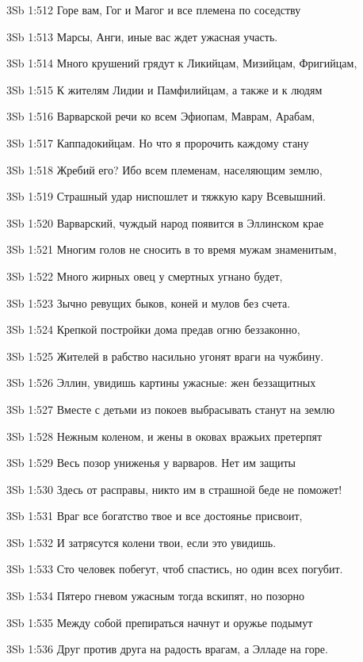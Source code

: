 \vs 3Sb 1:512 Горе вам, Гог и Магог и все племена по соседству  

\vs 3Sb 1:513 Марсы, Анги, иные  вас ждет ужасная участь.

\vs 3Sb 1:514 Много крушений грядут к Ликийцам, Мизийцам, Фригийцам,

\vs 3Sb 1:515 К жителям Лидии и Памфилийцам, а также и к людям 

\vs 3Sb 1:516 Варварской речи  ко всем Эфиопам, Маврам, Арабам, 

\vs 3Sb 1:517 Каппадокийцам. Но что я пророчить каждому стану 

\vs 3Sb 1:518 Жребий его? Ибо всем племенам, населяющим землю, 

\vs 3Sb 1:519 Страшный удар ниспошлет и тяжкую кару Всевышний.

\vs 3Sb 1:520 Варварский, чуждый народ появится в Эллинском крае  

\vs 3Sb 1:521 Многим голов не сносить в то время мужам знаменитым, 

\vs 3Sb 1:522 Много жирных овец у смертных угнано будет, 

\vs 3Sb 1:523 Зычно ревущих быков, коней и мулов без счета. 

\vs 3Sb 1:524 Крепкой постройки дома предав огню беззаконно,

\vs 3Sb 1:525 Жителей в рабство насильно угонят враги на чужбину. 

\vs 3Sb 1:526 Эллин, увидишь картины ужасные: жен беззащитных 

\vs 3Sb 1:527 Вместе с детьми из покоев выбрасывать станут на землю 

\vs 3Sb 1:528 Нежным коленом, и жены в оковах вражьих претерпят 

\vs 3Sb 1:529 Весь позор униженья у варваров. Нет им защиты

\vs 3Sb 1:530 Здесь от расправы, никто им в страшной беде не поможет! 

\vs 3Sb 1:531 Враг все богатство твое и все достоянье присвоит, 

\vs 3Sb 1:532 И затрясутся колени твои, если это увидишь. 

\vs 3Sb 1:533 Сто человек побегут, чтоб спастись, но один всех погубит. 

\vs 3Sb 1:534 Пятеро гневом ужасным тогда вскипят, но позорно

\vs 3Sb 1:535 Между собой препираться начнут и оружье подымут 

\vs 3Sb 1:536 Друг против друга на радость врагам, а Элладе  на горе. 


